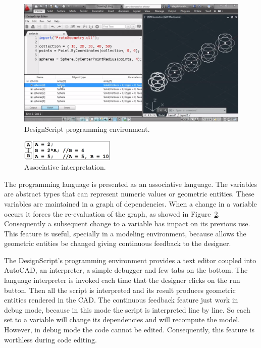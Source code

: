 \begin{figure}[!htbp]
  \centering
  \includegraphics[width=1.0\textwidth]{img/designScriptIDE}
    \caption{DesignScript programming environment.}  
  \label{fig:ds}
\end{figure} 


\begin{figure}
  \vspace{-25pt}
  \begin{center}
    \includegraphics[width=0.4\textwidth]{img/designscript}
  \end{center}
  \vspace{-20pt}
 \caption{Associative interpretation.}  
  \vspace{-20pt}
    \label{fig:designscript}
\end{figure}

The programming language is presented as an associative language. The variables are abstract types that can represent numeric values or geometric entities. These variables are maintained in a graph of dependencies. When a change in a variable occurs it forces the re-evaluation of the graph, as showed in Figure~\ref{fig:designscript}. Consequently a subsequent change to a variable has impact on its previous use. This feature is useful, specially in a modeling environment, because allows the geometric entities be changed giving continuous feedback to the designer.

The DesignScript's programming environment provides a text editor coupled into AutoCAD, an interpreter, a simple debugger and few tabs on the bottom. The language interpreter is invoked each time that the designer clicks on the run button. Then all the script is interpreted and its result produces geometric entities rendered in the CAD. The continuous feedback feature just work in debug mode, because in this mode the script is interpreted line by line. So each set to a variable will change its dependencies and will recompute the model. However, in debug mode the code cannot be edited. Consequently, this feature is worthless during code editing.

